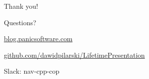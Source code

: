 \documentclass{panicsoftware-presentation}
\begin{document}
\begin{frame}{Thank you!}

\centerline{Questions?}

\vfill

\centerline{\alert{\href{http://blog.panicsoftware.com}{blog.panicsoftware.com}}}
\centerline{\alert{\href{https://github.com/dawidpilarski/LifetimePresentation}{github.com/dawidpilarski/LifetimePresentation}}}
\centerline{\alert{Slack: nav-cpp-cop}}
\end{frame}
\end{document}
